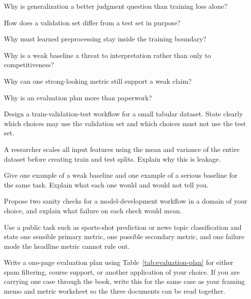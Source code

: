 \begin{studyquestions}
\item Why is generalization a better judgment question than training loss alone?
\item How does a validation set differ from a test set in purpose?
\item Why must learned preprocessing stay inside the training boundary?
\item Why is a weak baseline a threat to interpretation rather than only to competitiveness?
\item Why can one strong-looking metric still support a weak claim?
\item Why is an evaluation plan more than paperwork?
\end{studyquestions}

\begin{exercises}
\item Design a train-validation-test workflow for a small tabular dataset. State clearly which choices may use the validation set and which choices must not use the test set.
\item A researcher scales all input features using the mean and variance of the entire dataset before creating train and test splits. Explain why this is leakage.
\item Give one example of a weak baseline and one example of a serious baseline for the same task. Explain what each one would and would not tell you.
\item Propose two sanity checks for a model-development workflow in a domain of your choice, and explain what failure on each check would mean.
\item Use a public task such as sports-shot prediction or news topic classification and state one sensible primary metric, one possible secondary metric, and one failure mode the headline metric cannot rule out.
\item Write a one-page evaluation plan using Table~\ref{tab:evaluation-plan} for either spam filtering, course support, or another application of your choice. If you are carrying one case through the book, write this for the same case as your framing memo and metric worksheet so the three documents can be read together.
\end{exercises}

